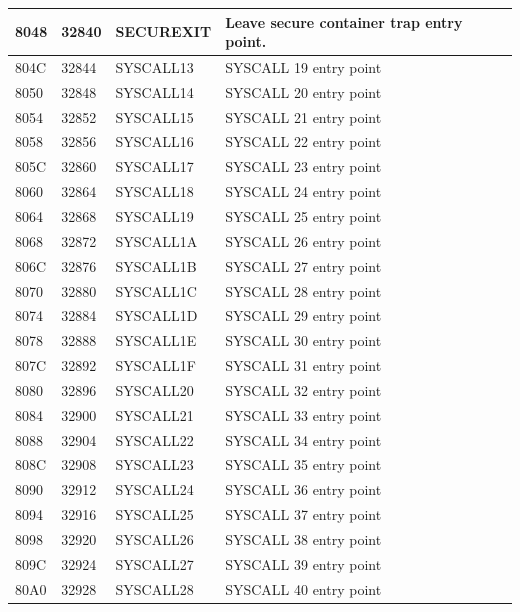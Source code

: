 \begin{longtable}{|L{1.2cm}|L{1.1cm}|C{2cm}|L{6cm}|}
\hline
\small  8048 & \small 32840 & SECUREXIT & Leave secure container trap entry point. \\
\hline
\small  804C & \small 32844 & SYSCALL13 & SYSCALL 19 entry point \\
\hline
\small  8050 & \small 32848 & SYSCALL14 & SYSCALL 20 entry point \\
\hline
\small  8054 & \small 32852 & SYSCALL15 & SYSCALL 21 entry point \\
\hline
\small  8058 & \small 32856 & SYSCALL16 & SYSCALL 22 entry point \\
\hline
\small  805C & \small 32860 & SYSCALL17 & SYSCALL 23 entry point \\
\hline
\small  8060 & \small 32864 & SYSCALL18 & SYSCALL 24 entry point \\
\hline
\small  8064 & \small 32868 & SYSCALL19 & SYSCALL 25 entry point \\
\hline
\small  8068 & \small 32872 & SYSCALL1A & SYSCALL 26 entry point \\
\hline
\small  806C & \small 32876 & SYSCALL1B & SYSCALL 27 entry point \\
\hline
\small  8070 & \small 32880 & SYSCALL1C & SYSCALL 28 entry point \\
\hline
\small  8074 & \small 32884 & SYSCALL1D & SYSCALL 29 entry point \\
\hline
\small  8078 & \small 32888 & SYSCALL1E & SYSCALL 30 entry point \\
\hline
\small  807C & \small 32892 & SYSCALL1F & SYSCALL 31 entry point \\
\hline
\small  8080 & \small 32896 & SYSCALL20 & SYSCALL 32 entry point \\
\hline
\small  8084 & \small 32900 & SYSCALL21 & SYSCALL 33 entry point \\
\hline
\small  8088 & \small 32904 & SYSCALL22 & SYSCALL 34 entry point \\
\hline
\small  808C & \small 32908 & SYSCALL23 & SYSCALL 35 entry point \\
\hline
\small  8090 & \small 32912 & SYSCALL24 & SYSCALL 36 entry point \\
\hline
\small  8094 & \small 32916 & SYSCALL25 & SYSCALL 37 entry point \\
\hline
\small  8098 & \small 32920 & SYSCALL26 & SYSCALL 38 entry point \\
\hline
\small  809C & \small 32924 & SYSCALL27 & SYSCALL 39 entry point \\
\hline
\small  80A0 & \small 32928 & SYSCALL28 & SYSCALL 40 entry point \\

\end{longtable}
